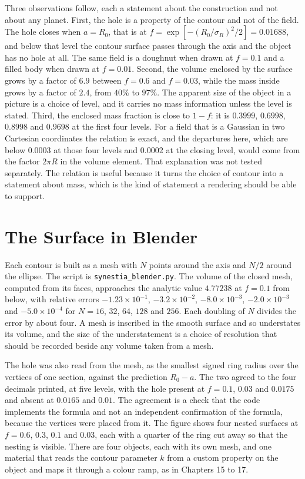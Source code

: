 Three observations follow, each a statement about the construction and not about any planet. First, the hole is a property of the contour and not of the field. The hole closes when $a=R_0$, that is at $f=\exp[-(R_0/\sigma_R)^2/2]=0.01688$, and below that level the contour surface passes through the axis and the object has no hole at all. The same field is a doughnut when drawn at $f=0.1$ and a filled body when drawn at $f=0.01$. Second, the volume enclosed by the surface grows by a factor of $6.9$ between $f=0.6$ and $f=0.03$, while the mass inside grows by a factor of $2.4$, from $40\%$ to $97\%$. The apparent size of the object in a picture is a choice of level, and it carries no mass information unless the level is stated. Third, the enclosed mass fraction is close to $1-f$: it is $0.3999$, $0.6998$, $0.8998$ and $0.9698$ at the first four levels. For a field that is a Gaussian in two Cartesian coordinates the relation is exact, and the departures here, which are below $0.0003$ at those four levels and $0.0002$ at the closing level, would come from the factor $2\pi R$ in the volume element. That explanation was not tested separately. The relation is useful because it turns the choice of contour into a statement about mass, which is the kind of statement a rendering should be able to support.

\section*{The Surface in Blender}

Each contour is built as a mesh with $N$ points around the axis and $N/2$ around the ellipse. The script is \texttt{synestia\_blender.py}. The volume of the closed mesh, computed from its faces, approaches the analytic value $4.77238$ at $f=0.1$ from below, with relative errors $-1.23\times10^{-1}$, $-3.2\times10^{-2}$, $-8.0\times10^{-3}$, $-2.0\times10^{-3}$ and $-5.0\times10^{-4}$ for $N=16$, $32$, $64$, $128$ and $256$. Each doubling of $N$ divides the error by about four. A mesh is inscribed in the smooth surface and so understates its volume, and the size of the understatement is a choice of resolution that should be recorded beside any volume taken from a mesh.

The hole was also read from the mesh, as the smallest signed ring radius over the vertices of one section, against the prediction $R_0-a$. The two agreed to the four decimals printed, at five levels, with the hole present at $f=0.1$, $0.03$ and $0.0175$ and absent at $0.0165$ and $0.01$. The agreement is a check that the code implements the formula and not an independent confirmation of the formula, because the vertices were placed from it. The figure shows four nested surfaces at $f=0.6$, $0.3$, $0.1$ and $0.03$, each with a quarter of the ring cut away so that the nesting is visible. There are four objects, each with its own mesh, and one material that reads the contour parameter $k$ from a custom property on the object and maps it through a colour ramp, as in Chapters 15 to 17.

